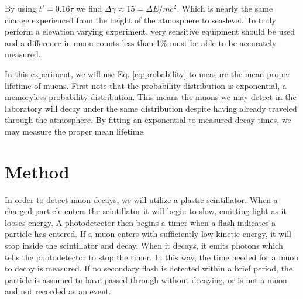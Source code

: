 \documentclass[12pt,twocolumn]{article}
\begin{document}
By using $t'=0.16\tau$ we find $\Delta\gamma\approx15=\Delta E / mc^2$. Which is nearly the same change experienced from the height of the atmosphere to sea-level. To truly perform a elevation varying experiment, very sensitive equipment should be used and a difference in muon counts less than 1\% must be able to be accurately measured.

In this experiment, we will use Eq. \ref{eq:probability} to measure the mean proper lifetime of muons. First note that the probability distribution is exponential, a memoryless probability distribution. This means the muons we may detect in the laboratory will decay under the same distribution despite having already traveled through the atmosphere. By fitting an exponential to measured decay times, we may measure the proper mean lifetime.

\section{Method}

In order to detect muon decays, we will utilize a plastic scintillator. When a charged particle enters the scintillator it will begin to slow, emitting light as it looses energy. A photodetector then begins a timer when a flash indicates a particle has entered. If a muon enters with sufficiently low kinetic energy, it will stop inside the scintillator and decay. When it decays, it emits photons which tells the photodetector to stop the timer. In this way, the time needed for a muon to decay is measured. If no secondary flash is detected within a brief period, the particle is assumed to have passed through without decaying, or is not a muon and not recorded as an event.
\end{document}
